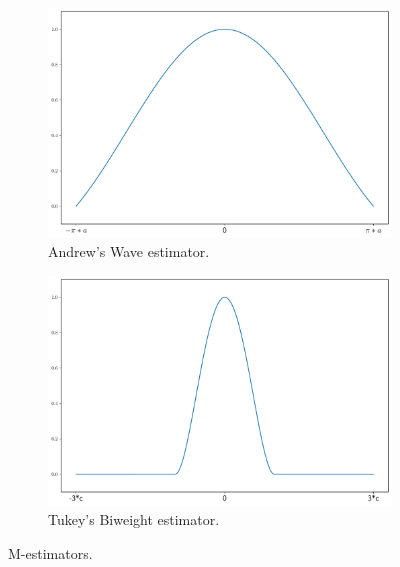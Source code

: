 \documentclass[11pt]{article}
\theoremstyle{definition}
\theoremstyle{remark}
\theoremstyle{remark}
\begin{document}
 \begin{figure}[H]
  \centering
  \begin{subfigure}[t]{0.475\textwidth}
      \centering
      \includegraphics[scale=0.20]{../figs/AndrewWave.pdf}
      \caption{Andrew’s Wave estimator.}
  \end{subfigure}
  \begin{subfigure}[t]{0.475\textwidth}
      \centering
      \includegraphics[scale=0.20]{../figs/TukeyBiweight.pdf}
      \caption{Tukey’s Biweight estimator.}
  \end{subfigure}
  \caption{M-estimators.}
  \label{fig:M-estimators_1}
\end{figure}
\end{document}

